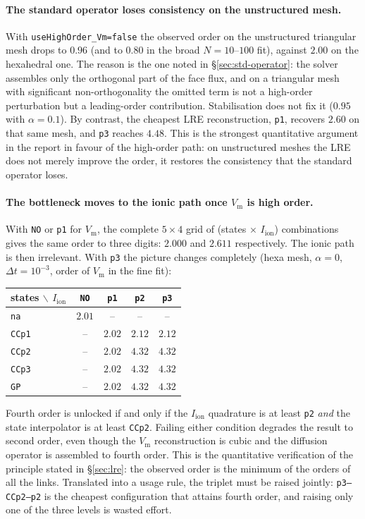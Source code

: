 \documentclass[11pt,a4paper]{article}
\newcommand{\code}[1]{\texttt{\small #1}}
\newcommand{\Vm}{V_{\text{m}}}
\newcommand{\Iion}{I_{\mathrm{ion}}}
\begin{document}
\paragraph{The standard operator loses consistency on the unstructured mesh.}
With \code{useHighOrder\_Vm=false} the observed order on the unstructured
triangular mesh drops to $0.96$ (and to $0.80$ in the broad $N=10$--$100$ fit),
against $2.00$ on the hexahedral one. The reason is the one noted in
\S\ref{sec:std-operator}: the solver assembles only the orthogonal part of the
face flux, and on a triangular mesh with significant non-orthogonality the
omitted term is not a high-order perturbation but a leading-order contribution.
Stabilisation does not fix it ($0.95$ with $\alpha=0.1$). By contrast, the
cheapest LRE reconstruction, \code{p1}, recovers $2.60$ on that same mesh, and
\code{p3} reaches $4.48$. This is the strongest quantitative argument in the
report in favour of the high-order path: on unstructured meshes the LRE does not
merely improve the order, it restores the consistency that the standard operator
loses.

\paragraph{The bottleneck moves to the ionic path once $\Vm$ is high order.}
With \code{NO} or \code{p1} for $\Vm$, the complete $5\times4$ grid of
(states $\times$ $\Iion$) combinations gives the same order to three digits:
$2.000$ and $2.611$ respectively. The ionic path is then irrelevant. With
\code{p3} the picture changes completely (hexa mesh, $\alpha=0$,
$\Delta t=10^{-3}$, order of $\Vm$ in the fine fit):
\begin{center}
\begin{tabular}{@{}lcccc@{}}
\toprule
states $\backslash$ $\Iion$ & \code{NO} & \code{p1} & \code{p2} & \code{p3} \\
\midrule
\code{na}   & $2.01$ & --     & --     & --     \\
\code{CCp1} & --     & $2.02$ & $2.12$ & $2.12$ \\
\code{CCp2} & --     & $2.02$ & $\mathbf{4.32}$ & $\mathbf{4.32}$ \\
\code{CCp3} & --     & $2.02$ & $\mathbf{4.32}$ & $\mathbf{4.32}$ \\
\code{GP}   & --     & $2.02$ & $\mathbf{4.32}$ & $\mathbf{4.32}$ \\
\bottomrule
\end{tabular}
\end{center}
Fourth order is unlocked if and only if the $\Iion$ quadrature is at least
\code{p2} \emph{and} the state interpolator is at least \code{CCp2}. Failing
either condition degrades the result to second order, even though the $\Vm$
reconstruction is cubic and the diffusion operator is assembled to fourth order.
This is the quantitative verification of the principle stated in
\S\ref{sec:lre}: the observed order is the minimum of the orders of all the
links. Translated into a usage rule, the triplet must be raised jointly:
\code{p3--CCp2--p2} is the cheapest configuration that attains fourth order, and
raising only one of the three levels is wasted effort.
\end{document}
